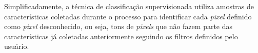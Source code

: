 Simplificadamente, a técnica de classificação supervisionada utiliza amostras de características coletadas durante o processo para identificar cada \textit{pixel} definido como \textit{pixel} desconhecido, ou seja, tons de \textit{pixels} que não fazem parte das características já coletadas anteriormente seguindo os filtros definidos pelo usuário.



